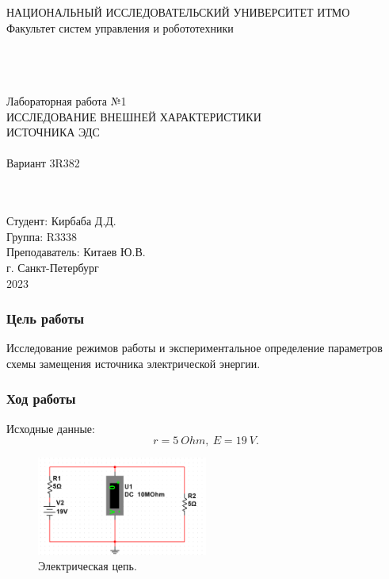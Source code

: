 \documentclass[12pt]{article}
\begin{document}
\begin{titlepage}
\begin{center}
    НАЦИОНАЛЬНЫЙ ИССЛЕДОВАТЕЛЬСКИЙ УНИВЕРСИТЕТ ИТМО \\
    Факультет систем управления и робототехники \\
    \vspace*{10\baselineskip}
    {} \\
    \ \\
    \ \\
    \begin{spacing}{1.5}
    {\large Лабораторная работа №1 \\
    ИССЛЕДОВАНИЕ ВНЕШНЕЙ ХАРАКТЕРИСТИКИ \\ ИСТОЧНИКА ЭДС \\
    \ \\
    Вариант 3R382}
    \end{spacing} \\
    \ \\
    \vspace*{10\baselineskip}
    \hfill {Студент: Кирбаба Д.Д.\ \ \ \ \ \ \ \ \ } \\
    \hfill {Группа: R3338\ \ \ \ \ \ \ \ \ \ \ \ \ \ \ \ \ \ \ \ \ } \\
    \hfill {Преподаватель: Китаев Ю.В.} \\
    \mbox{}
    \vfill {г. Санкт-Петербург\\2023}
\end{center}
\end{titlepage}

\subsubsection*{Цель работы}
Исследование режимов работы и экспериментальное определение параметров схемы замещения источника электрической энергии.

\subsubsection*{Ход работы}
Исходные данные:
\[
    r = 5 \ Ohm, \ E = 19 \ V.
\]

\begin{figure}[H]
    \centering
    \includegraphics[width=0.5\textwidth]{1_scheme.png}
    \caption{Электрическая цепь.}
    \label{fig:1_scheme}
\end{figure}
\end{document}
